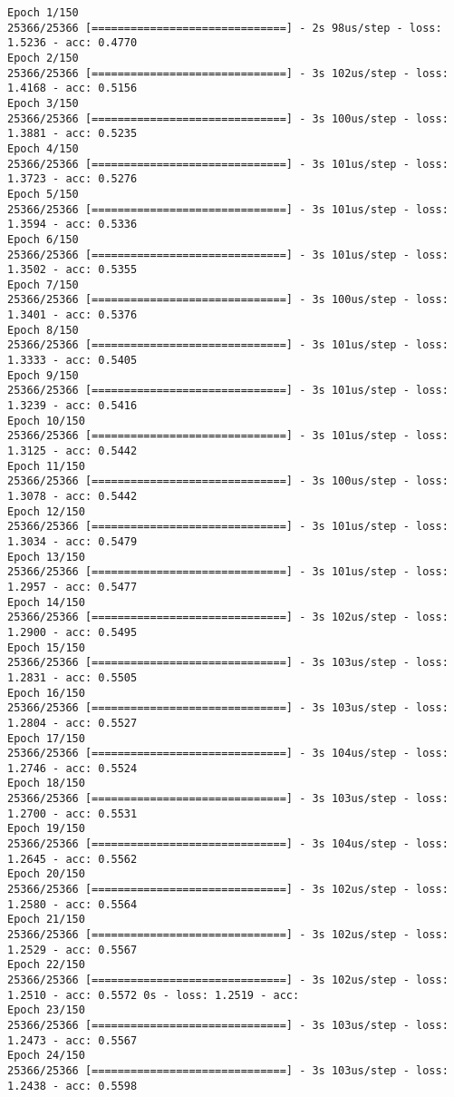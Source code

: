 \documentclass[11pt]{article}
\begin{document}
    \begin{Verbatim}[commandchars=\\\{\}]
Epoch 1/150
25366/25366 [==============================] - 2s 98us/step - loss: 1.5236 - acc: 0.4770
Epoch 2/150
25366/25366 [==============================] - 3s 102us/step - loss: 1.4168 - acc: 0.5156
Epoch 3/150
25366/25366 [==============================] - 3s 100us/step - loss: 1.3881 - acc: 0.5235
Epoch 4/150
25366/25366 [==============================] - 3s 101us/step - loss: 1.3723 - acc: 0.5276
Epoch 5/150
25366/25366 [==============================] - 3s 101us/step - loss: 1.3594 - acc: 0.5336
Epoch 6/150
25366/25366 [==============================] - 3s 101us/step - loss: 1.3502 - acc: 0.5355
Epoch 7/150
25366/25366 [==============================] - 3s 100us/step - loss: 1.3401 - acc: 0.5376
Epoch 8/150
25366/25366 [==============================] - 3s 101us/step - loss: 1.3333 - acc: 0.5405
Epoch 9/150
25366/25366 [==============================] - 3s 101us/step - loss: 1.3239 - acc: 0.5416
Epoch 10/150
25366/25366 [==============================] - 3s 101us/step - loss: 1.3125 - acc: 0.5442
Epoch 11/150
25366/25366 [==============================] - 3s 100us/step - loss: 1.3078 - acc: 0.5442
Epoch 12/150
25366/25366 [==============================] - 3s 101us/step - loss: 1.3034 - acc: 0.5479
Epoch 13/150
25366/25366 [==============================] - 3s 101us/step - loss: 1.2957 - acc: 0.5477
Epoch 14/150
25366/25366 [==============================] - 3s 102us/step - loss: 1.2900 - acc: 0.5495
Epoch 15/150
25366/25366 [==============================] - 3s 103us/step - loss: 1.2831 - acc: 0.5505
Epoch 16/150
25366/25366 [==============================] - 3s 103us/step - loss: 1.2804 - acc: 0.5527
Epoch 17/150
25366/25366 [==============================] - 3s 104us/step - loss: 1.2746 - acc: 0.5524
Epoch 18/150
25366/25366 [==============================] - 3s 103us/step - loss: 1.2700 - acc: 0.5531
Epoch 19/150
25366/25366 [==============================] - 3s 104us/step - loss: 1.2645 - acc: 0.5562
Epoch 20/150
25366/25366 [==============================] - 3s 102us/step - loss: 1.2580 - acc: 0.5564
Epoch 21/150
25366/25366 [==============================] - 3s 102us/step - loss: 1.2529 - acc: 0.5567
Epoch 22/150
25366/25366 [==============================] - 3s 102us/step - loss: 1.2510 - acc: 0.5572 0s - loss: 1.2519 - acc:
Epoch 23/150
25366/25366 [==============================] - 3s 103us/step - loss: 1.2473 - acc: 0.5567
Epoch 24/150
25366/25366 [==============================] - 3s 103us/step - loss: 1.2438 - acc: 0.5598

\end{Verbatim}
\end{document}
